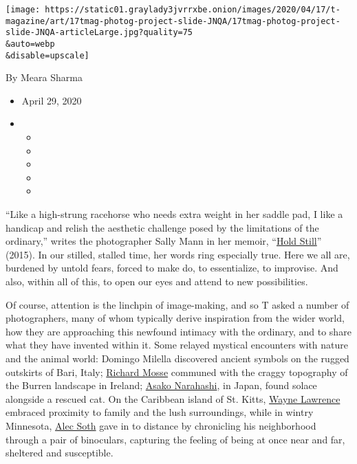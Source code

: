 \texttt{[image: https://static01.graylady3jvrrxbe.onion/images/2020/04/17/t-magazine/art/17tmag-photog-project-slide-JNQA/17tmag-photog-project-slide-JNQA-articleLarge.jpg?quality=75\\\&auto=webp\\\&disable=upscale]}

By Meara Sharma

\begin{itemize}
\item
  April 29, 2020
\item
  \begin{itemize}
  \item
  \item
  \item
  \item
  \item
  \end{itemize}
\end{itemize}

``Like a high-strung racehorse who needs extra weight in her saddle pad,
I like a handicap and relish the aesthetic challenge posed by the
limitations of the ordinary,'' writes the photographer Sally Mann in her
memoir,
``\href{https://www.hachettebookgroup.com/titles/sally-mann/hold-still/9780316247757/}{Hold
Still}'' (2015). In our stilled, stalled time, her words ring especially
true. Here we all are, burdened by untold fears, forced to make do, to
essentialize, to improvise. And also, within all of this, to open our
eyes and attend to new possibilities.

Of course, attention is the linchpin of image-making, and so T asked a
number of photographers, many of whom typically derive inspiration from
the wider world, how they are approaching this newfound intimacy with
the ordinary, and to share what they have invented within it. Some
relayed mystical encounters with nature and the animal world: Domingo
Milella discovered ancient symbols on the rugged outskirts of Bari,
Italy;
\href{http://www.richardmosse.com/projects/incoming\#home}{Richard
Mosse} communed with the craggy topography of the Burren landscape in
Ireland; \href{http://03fotos.com/asako-narahashi/}{Asako Narahashi}, in
Japan, found solace alongside a rescued cat. On the Caribbean island of
St. Kitts, \href{http://waynelawrenceonline.com/}{Wayne Lawrence}
embraced proximity to family and the lush surroundings, while in wintry
Minnesota, \href{https://alecsoth.com/photography/}{Alec Soth} gave in
to distance by chronicling his neighborhood through a pair of
binoculars, capturing the feeling of being at once near and far,
sheltered and susceptible.

